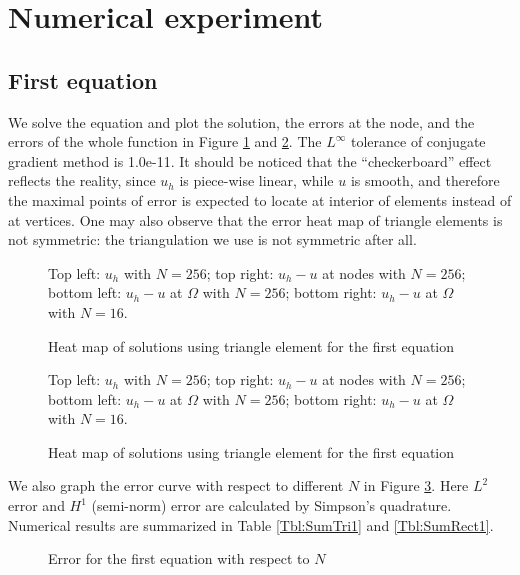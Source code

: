 \documentclass[english, nochinese]{pnote}
\begin{document}
\section{Numerical experiment}

\subsection{First equation}

We solve the equation and plot the solution, the errors at the node, and the errors of the whole function in Figure \ref{Fig:Tri1} and \ref{Fig:Rect1}. The $L^{\infty}$ tolerance of conjugate gradient method is 1.0e-11. It should be noticed that the ``checkerboard'' effect reflects the reality, since $u_h$ is piece-wise linear, while $u$ is smooth, and therefore the maximal points of error is expected to locate at interior of elements instead of at vertices. One may also observe that the error heat map of triangle elements is not symmetric: the triangulation we use is not symmetric after all.

\begin{figure}[htbp]
{
\centering
\scalebox{0.7}{}
\caption{Heat map of solutions using triangle element for the first equation}
\label{Fig:Tri1}
}
{
\footnotesize Top left: $u_h$ with $ N = 256 $; top right: $ u_h - u $ at nodes with $ N = 256 $; bottom left: $ u_h - u $ at $\Omega$ with $ N = 256 $; bottom right: $ u_h - u $ at $\Omega$ with $ N = 16 $.
}
\end{figure}

\begin{figure}[htbp]
{
\centering
\scalebox{0.7}{}
\caption{Heat map of solutions using triangle element for the first equation}
\label{Fig:Rect1}
}
{
\footnotesize Top left: $u_h$ with $ N = 256 $; top right: $ u_h - u $ at nodes with $ N = 256 $; bottom left: $ u_h - u $ at $\Omega$ with $ N = 256 $; bottom right: $ u_h - u $ at $\Omega$ with $ N = 16 $.
}
\end{figure}

We also graph the error curve with respect to different $N$ in Figure \ref{Fig:Err1}. Here $L^2$ error and $H^1$ (semi-norm) error are calculated by Simpson's quadrature. Numerical results are summarized in Table \ref{Tbl:SumTri1} and \ref{Tbl:SumRect1}.

\begin{figure}[htbp]
\centering

\caption{Error for the first equation with respect to $N$}
\label{Fig:Err1}
\end{figure}
\end{document}
